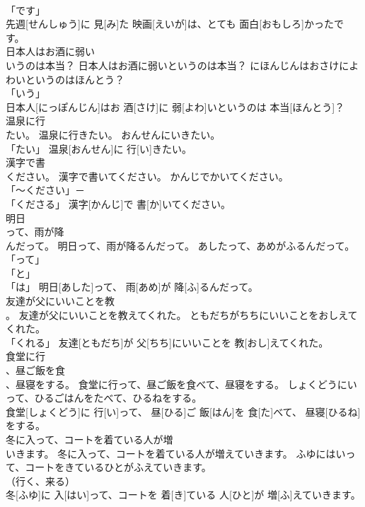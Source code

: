 \documentclass[8pt]{extreport}
\begin{document}
\begin{CJK}{UTF8}{min}
\\	「です」 
\\	先週[せんしゅう]に 見[み]た 映画[えいが]は、とても 面白[おもしろ]かったです。		
\\	日本人はお酒に弱い
\\	いうのは本当？	日本人はお酒に弱いというのは本当？	にほんじんはおさけによわいというのはほんとう？	
\\	「いう」 
\\	日本人[にっぽんじん]はお 酒[さけ]に 弱[よわ]いというのは 本当[ほんとう]？		
\\	温泉に行
\\	たい。	温泉に行きたい。	おんせんにいきたい。	
\\	「たい」	温泉[おんせん]に 行[い]きたい。		
\\	漢字で書
\\	ください。	漢字で書いてください。	かんじでかいてください。	
\\	「～ください」－ 
\\	「くださる」	漢字[かんじ]で 書[か]いてください。		
\\	明日
\\	って、雨が降
\\	んだって。	明日って、雨が降るんだって。	あしたって、あめがふるんだって。	
\\	「って」 
\\	「と」 
\\	「は」	明日[あした]って、 雨[あめ]が 降[ふ]るんだって。		
\\	友達が父にいいことを教
\\	。	友達が父にいいことを教えてくれた。	ともだちがちちにいいことをおしえてくれた。	
\\	「くれる」	友達[ともだち]が 父[ちち]にいいことを 教[おし]えてくれた。		
\\	食堂に行
\\	、昼ご飯を食
\\	、昼寝をする。	食堂に行って、昼ご飯を食べて、昼寝をする。	しょくどうにいって、ひるごはんをたべて、ひるねをする。	
\\	食堂[しょくどう]に 行[い]って、 昼[ひる]ご 飯[はん]を 食[た]べて、 昼寝[ひるね]をする。		
\\	冬に入って、コートを着ている人が増
\\	いきます。	冬に入って、コートを着ている人が増えていきます。	ふゆにはいって、コートをきているひとがふえていきます。	
\\	（行く、来る） 
\\	冬[ふゆ]に 入[はい]って、コートを 着[き]ている 人[ひと]が 増[ふ]えていきます。		

\end{CJK}
\end{document}

